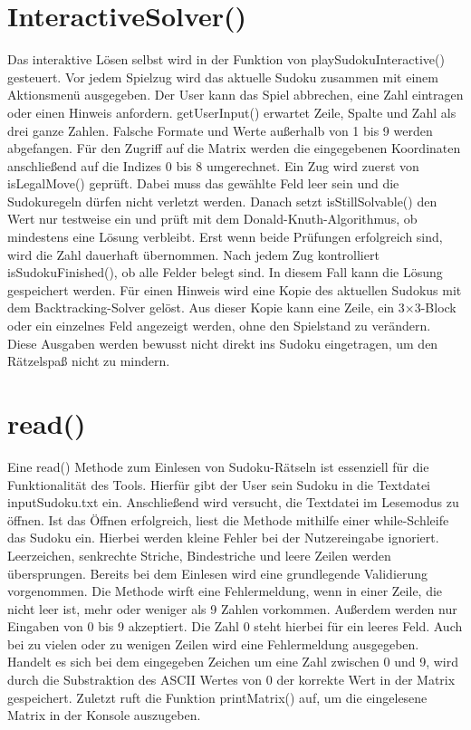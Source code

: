 \documentclass[a4paper,10pt]{article}
\begin{document}
\section{InteractiveSolver()}

Das interaktive Lösen selbst wird in der Funktion von playSudokuInteractive() gesteuert. Vor jedem Spielzug wird das aktuelle Sudoku zusammen mit einem Aktionsmenü ausgegeben. Der User kann das Spiel abbrechen, eine Zahl eintragen oder einen Hinweis anfordern. getUserInput() erwartet Zeile, Spalte und Zahl als drei ganze Zahlen. Falsche Formate und Werte außerhalb von 1 bis 9 werden abgefangen. Für den Zugriff auf die Matrix werden die eingegebenen Koordinaten anschließend auf die Indizes 0 bis 8 umgerechnet.
Ein Zug wird zuerst von isLegalMove() geprüft. Dabei muss das gewählte Feld leer sein und die Sudokuregeln dürfen nicht verletzt werden. Danach setzt isStillSolvable() den Wert nur testweise ein und prüft mit dem Donald-Knuth-Algorithmus, ob mindestens eine Lösung verbleibt. Erst wenn beide Prüfungen erfolgreich sind, wird die Zahl dauerhaft übernommen. Nach jedem Zug kontrolliert isSudokuFinished(), ob alle Felder belegt sind. In diesem Fall kann die Lösung gespeichert werden.
Für einen Hinweis wird eine Kopie des aktuellen Sudokus mit dem Backtracking-Solver gelöst. Aus dieser Kopie kann eine Zeile, ein 3×3-Block oder ein einzelnes Feld angezeigt werden, ohne den Spielstand zu verändern. Diese Ausgaben werden bewusst nicht direkt ins Sudoku eingetragen, um den Rätzelspaß nicht zu mindern.



\section{read()} \label{read}

Eine read() Methode zum Einlesen von Sudoku-Rätseln ist essenziell für die Funktionalität des Tools. Hierfür gibt der User sein Sudoku in die Textdatei inputSudoku.txt ein. Anschließend wird versucht, die Textdatei im Lesemodus zu öffnen. Ist das Öffnen erfolgreich, liest die Methode mithilfe einer while-Schleife das Sudoku ein. Hierbei werden kleine Fehler bei der Nutzereingabe ignoriert. Leerzeichen, senkrechte Striche, Bindestriche und leere Zeilen werden übersprungen. Bereits bei dem Einlesen wird eine grundlegende Validierung vorgenommen. Die Methode wirft eine Fehlermeldung, wenn in einer Zeile, die nicht leer ist, mehr oder weniger als 9 Zahlen vorkommen. Außerdem werden nur Eingaben von 0 bis 9 akzeptiert. Die Zahl 0 steht hierbei für ein leeres Feld. Auch bei zu vielen oder zu wenigen Zeilen wird eine Fehlermeldung ausgegeben. Handelt es sich bei dem eingegeben Zeichen um eine Zahl zwischen 0 und 9, wird durch die Substraktion des ASCII Wertes von 0 der korrekte Wert in der Matrix gespeichert. Zuletzt ruft die Funktion printMatrix() auf, um die eingelesene Matrix in der Konsole auszugeben.
\end{document}
